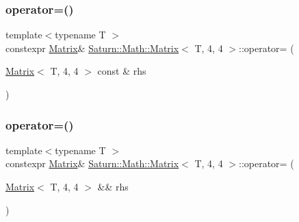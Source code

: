 \subsubsection{\texorpdfstring{operator=()}{operator=()}\hspace{0.1cm}{\footnotesize\ttfamily [1/2]}}
{\footnotesize\ttfamily template$<$typename T $>$ \\
constexpr \mbox{\hyperlink{class_saturn_1_1_math_1_1_matrix}{Matrix}}\& \mbox{\hyperlink{class_saturn_1_1_math_1_1_matrix}{Saturn\+::\+Math\+::\+Matrix}}$<$ T, 4, 4 $>$\+::operator= (\begin{DoxyParamCaption}\item[{\mbox{\hyperlink{class_saturn_1_1_math_1_1_matrix}{Matrix}}$<$ T, 4, 4 $>$ const \&}]{rhs }\end{DoxyParamCaption})\hspace{0.3cm}{\ttfamily [inline]}}

\mbox{\label{class_saturn_1_1_math_1_1_matrix_3_01_t_00_014_00_014_01_4_ae8a9f34a10f15e14aa79bccaad5e3fdf}} 
\subsubsection{\texorpdfstring{operator=()}{operator=()}\hspace{0.1cm}{\footnotesize\ttfamily [2/2]}}
{\footnotesize\ttfamily template$<$typename T $>$ \\
constexpr \mbox{\hyperlink{class_saturn_1_1_math_1_1_matrix}{Matrix}}\& \mbox{\hyperlink{class_saturn_1_1_math_1_1_matrix}{Saturn\+::\+Math\+::\+Matrix}}$<$ T, 4, 4 $>$\+::operator= (\begin{DoxyParamCaption}\item[{\mbox{\hyperlink{class_saturn_1_1_math_1_1_matrix}{Matrix}}$<$ T, 4, 4 $>$ \&\&}]{rhs }\end{DoxyParamCaption})\hspace{0.3cm}{\ttfamily [inline]}}

\mbox{\label{class_saturn_1_1_math_1_1_matrix_3_01_t_00_014_00_014_01_4_a3bd3f8ea6b95ad010bb33daf5d25bb4b}} 
